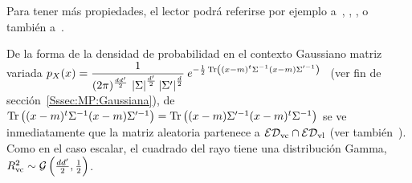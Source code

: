 
Para  tener   m\'as  propiedades,  el  lector  podr\'a   referirse  por  ejemplo
a~\cite{FanChe84},  \cite[\S~9.2 \&~9.3]{GupNag99},  \cite[\S~13.2]{BilBre99}, o
tambi\'en a~\cite{And03, Daw78, Daw81, LibrosABuscar}.

\begin{ejemplo}\label{Ej:MP:GaussianaMatriz}
%
  De la  forma de la  densidad de probabilidad  en el contexto  Gaussiano matriz
  variada $\displaystyle  p_X(x) =  \frac{1}{(2 \pi)^{\frac{d d'}{2}}  \, \left|
      \Sigma  \right|^{\frac{d'}{2}}  \left|  \Sigma' \right|^{\frac{d}{2}}}  \:
  e^{-\frac12 \operatorname{Tr} \left( (x-m)^t \Sigma^{-1} (x-m) \Sigma'^{-1} \right)}$ \ (ver
  fin de secci\'on~\ref{Sssec:MP:Gaussiana}), de $\operatorname{Tr} \left( (x-m)^t \Sigma^{-1}
    (x-m)  \Sigma'^{-1}   \right)  =  \operatorname{Tr}  \left(   (x-m)  \Sigma'^{-1}  (x-m)^t
    \Sigma^{-1} \right)$ se ve  inmediatamente que la matriz aleatoria partenece
  a $\mathcal{ED}_{\mathrm{vc}} \cap \mathcal{ED}_{\mathrm{vl}}$ (ver tambi\'en~\cite{Daw81, FanKot99, FanNad04}).
  Como en el caso escalar, el  cuadrado del rayo tiene una distribuci\'on Gamma,
  $R_{\mathrm{vc}}^2 \sim \mathcal{G}\left( \frac{d d'}{2} , \frac12 \right)$. 
\end{ejemplo}

